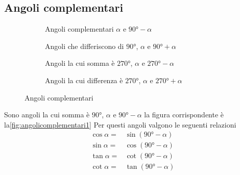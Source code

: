 \subsection{Angoli complementari}
\label{sub:AngoliComp}
\begin{figure}
	\begin{subfigure}[b]{.49\linewidth}
    	\centering
    	
    	\caption{Angoli complementari $\alpha$ e  $\ang{90}-\alpha$}\label{fig:angolicomplementari1}
    \end{subfigure}
  	\begin{subfigure}[b]{.49\linewidth}
  		\centering
  		
  		\caption{Angoli che differiscono di $\ang{90}$, $\alpha$ e $\ang{90}+\alpha$}\label{fig:angolicomplementari2}
  	\end{subfigure}
    \begin{subfigure}[b]{.49\linewidth}
  		\centering
  		
  		\caption{Angoli la cui somma è $\ang{270}$,  $\alpha$ e $\ang{270}-\alpha$}\label{tab:angolicomplementari3}	
  	\end{subfigure}
	\begin{subfigure}[b]{.49\linewidth}
		\centering
		
		\caption{Angoli la cui differenza è $\ang{270}$, $\alpha$ e $\ang{270}+\alpha$}\label{tab:angolicomplementari4}	
	\end{subfigure}
	\caption{Angoli complementari}
	\label{fig:angolicomplementari}
\end{figure}
Sono angoli la cui somma è $\ang{90}$, $\alpha$ e $\ang{90}-\alpha$ la figura corrispondente è la\nobs\vref{fig:angolicomplementari1}
%	
Per questi angoli valgono le seguenti relazioni
\begin{align*}
\cos\alpha=&{}\sin(\ang{90}-\alpha)\\
\sin\alpha=&{}\cos(\ang{90}-\alpha)\\
\tan\alpha=&{}\cot(\ang{90}-\alpha)\\
\cot\alpha=&{}\tan(\ang{90}-\alpha)
\end{align*}
